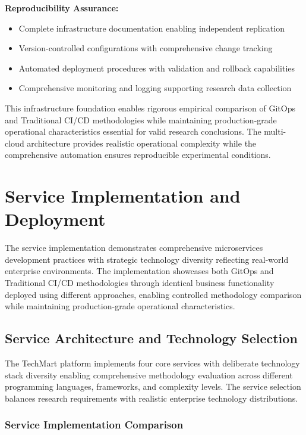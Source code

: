 \textbf{Reproducibility Assurance:}
\begin{itemize}
\item Complete infrastructure documentation enabling independent replication
\item Version-controlled configurations with comprehensive change tracking
\item Automated deployment procedures with validation and rollback capabilities
\item Comprehensive monitoring and logging supporting research data collection
\end{itemize}

This infrastructure foundation enables rigorous empirical comparison of GitOps and Traditional CI/CD methodologies while maintaining production-grade operational characteristics essential for valid research conclusions. The multi-cloud architecture provides realistic operational complexity while the comprehensive automation ensures reproducible experimental conditions.

\section{Service Implementation and Deployment}

The service implementation demonstrates comprehensive microservices development practices with strategic technology diversity reflecting real-world enterprise environments. The implementation showcases both GitOps and Traditional CI/CD methodologies through identical business functionality deployed using different approaches, enabling controlled methodology comparison while maintaining production-grade operational characteristics.

\subsection{Service Architecture and Technology Selection}

The TechMart platform implements four core services with deliberate technology stack diversity enabling comprehensive methodology evaluation across different programming languages, frameworks, and complexity levels. The service selection balances research requirements with realistic enterprise technology distributions.

\subsubsection{Service Implementation Comparison}

